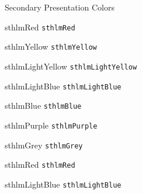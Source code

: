 \documentclass[compress]{beamer}
\begin{document}
\begin{frame}{Secondary Presentation Colors}
\begin{multicols}{2}
	
\begin{beamercolorbox}[wd=\linewidth,ht=2ex,dp=0.7ex]{sthlmRed}
	\texttt{sthlmRed}
\end{beamercolorbox}

\begin{beamercolorbox}[wd=\linewidth,ht=2ex,dp=0.7ex]{sthlmYellow}
	\texttt{sthlmYellow}
\end{beamercolorbox}

\begin{beamercolorbox}[wd=\linewidth,ht=2ex,dp=0.7ex]{sthlmLightYellow}
	\texttt{sthlmLightYellow}
\end{beamercolorbox}

\begin{beamercolorbox}[wd=\linewidth,ht=2ex,dp=0.7ex]{sthlmLightBlue}
	\texttt{sthlmLightBlue}
\end{beamercolorbox}

\begin{beamercolorbox}[wd=\linewidth,ht=2ex,dp=0.7ex]{sthlmBlue}
	\texttt{sthlmBlue}
\end{beamercolorbox}

\begin{beamercolorbox}[wd=\linewidth,ht=2ex,dp=0.7ex]{sthlmPurple}
	\texttt{sthlmPurple}
\end{beamercolorbox}

\begin{beamercolorbox}[wd=\linewidth,ht=2ex,dp=0.7ex]{sthlmGrey}
	\texttt{sthlmGrey}
\end{beamercolorbox}



\begin{beamercolorbox}[wd=\linewidth,ht=2ex,dp=0.7ex]{sthlmRed}
	\texttt{sthlmRed}
\end{beamercolorbox}

\begin{beamercolorbox}[wd=\linewidth,ht=2ex,dp=0.7ex]{sthlmLightBlue}
	\texttt{sthlmLightBlue}
\end{beamercolorbox}


\end{multicols}
\end{frame}
\end{document}
